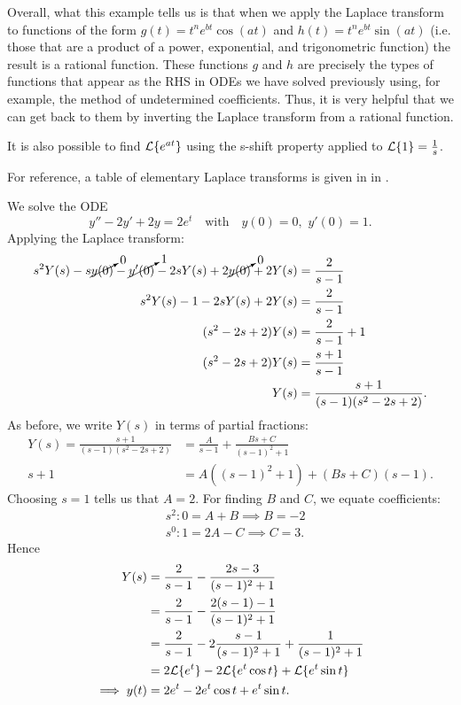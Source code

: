 Overall, what this example tells us is that when we apply the Laplace transform to functions of the form $g(t) = t^ne^{bt}\cos(at)$ and $h(t) = t^ne^{bt}\sin(at)$ (i.e. those that are a product of a power, exponential, and trigonometric function) the result is a rational function. These functions $g$ and $h$ are precisely the types of functions that appear as the RHS in ODEs we have solved previously using, for example, the method of undetermined coefficients. Thus, it is very helpful that we can get back to them by inverting the Laplace transform from a rational function.

\begin{remark}
	It is also possible to find $\mathcal{L}\{e^{at}\}$ using the s-shift property applied to $\mathcal{L}\{1\} = \frac{1}{s}$.
\end{remark}

For reference, a table of elementary Laplace transforms is given in  in .

\begin{eg}
	We solve the ODE
	\[
	y''-2y'+2y=2e^t \quad\text{with}\quad y(0)=0, \,\,y'(0)=1.
	\]
	Applying the Laplace transform:
	\begin{align*}
		s^2Y(s) - s\cancelto{0}{y(0)} - \cancelto{1}{y'(0)} - 2sY(s) + 2\cancelto{0}{y(0)} + 2Y(s) &= \frac{2}{s-1} \\
		s^2Y(s) - 1 - 2sY(s) + 2Y(s) &= \frac{2}{s-1} \\
		(s^2-2s+2)Y(s) &= \frac{2}{s-1} + 1 \\
		(s^2-2s+2)Y(s) &= \frac{s+1}{s-1} \\
		Y(s) &= \frac{s+1}{(s-1)(s^2-2s+2)}.
	\end{align*}
	As before, we write $Y(s)$ in terms of partial fractions:
	\begin{align*}
		Y(s) = \frac{s+1}{(s-1)(s^2-2s+2)} &= \frac{A}{s-1} + \frac{Bs+C}{(s-1)^2+1} \\
		s+1 &= A((s-1)^2+1) + (Bs+C)(s-1).
	\end{align*}
	Choosing $s=1$ tells us that $A=2$. For finding $B$ and $C$, we equate coefficients:
	\begin{align*}
		&s^2 : 0 = A+B \implies B=-2 \\
		&s^0 : 1 = 2A-C \implies C=3.
	\end{align*}
	Hence
	\begin{align*}
		Y(s) &= \frac{2}{s-1} - \frac{2s-3}{(s-1)^2+1} \\
		&= \frac{2}{s-1} - \frac{2(s-1)-1}{(s-1)^2+1} \\
		&= \frac{2}{s-1} - 2\frac{s-1}{(s-1)^2+1} + \frac{1}{(s-1)^2+1} \\
		&= 2\mathcal{L}\{e^t\} - 2\mathcal{L}\{e^t\cos{t}\} + \mathcal{L}\{e^t\sin{t}\} \\
		\implies y(t) &= 2e^t - 2e^t\cos{t} + e^t\sin{t}.
	\end{align*}
\end{eg}

